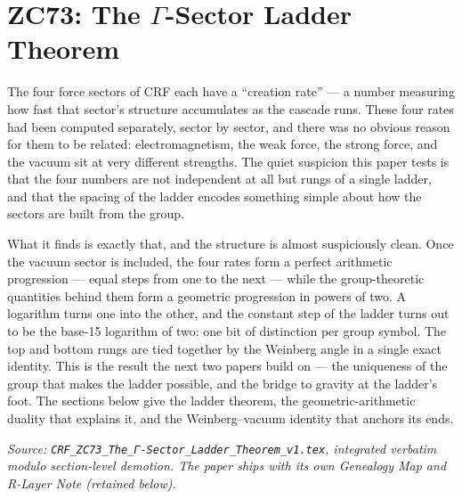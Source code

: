 \documentclass[12pt, a4paper]{article}
\begin{document}


\section{ZC73: The $\Gamma$-Sector Ladder Theorem}

The four force sectors of CRF each have a ``creation rate'' --- a number
measuring how fast that sector's structure accumulates as the cascade runs.
These four rates had been computed separately, sector by sector, and there was
no obvious reason for them to be related: electromagnetism, the weak force, the
strong force, and the vacuum sit at very different strengths. The quiet
suspicion this paper tests is that the four numbers are not independent at all
but rungs of a single ladder, and that the spacing of the ladder encodes
something simple about how the sectors are built from the group.

What it finds is exactly that, and the structure is almost suspiciously clean.
Once the vacuum sector is included, the four rates form a perfect arithmetic
progression --- equal steps from one to the next --- while the group-theoretic
quantities behind them form a geometric progression in powers of two. A
logarithm turns one into the other, and the constant step of the ladder turns
out to be the base-15 logarithm of two: one bit of distinction per group
symbol. The top and bottom rungs are tied together by the Weinberg angle in a
single exact identity. This is the result the next two papers build on --- the
uniqueness of the group that makes the ladder possible, and the bridge to
gravity at the ladder's foot. The sections below give the ladder theorem, the
geometric-arithmetic duality that explains it, and the Weinberg--vacuum
identity that anchors its ends.
\label{sec:zc73}

\noindent
\textit{Source: \texttt{CRF\_ZC73\_The\_Γ-Sector\_Ladder\_Theorem\_v1.tex}, integrated verbatim modulo
section-level demotion. The paper ships with its own Genealogy Map
and R-Layer Note (retained below).}

\medskip

\sloppy
\end{document}
